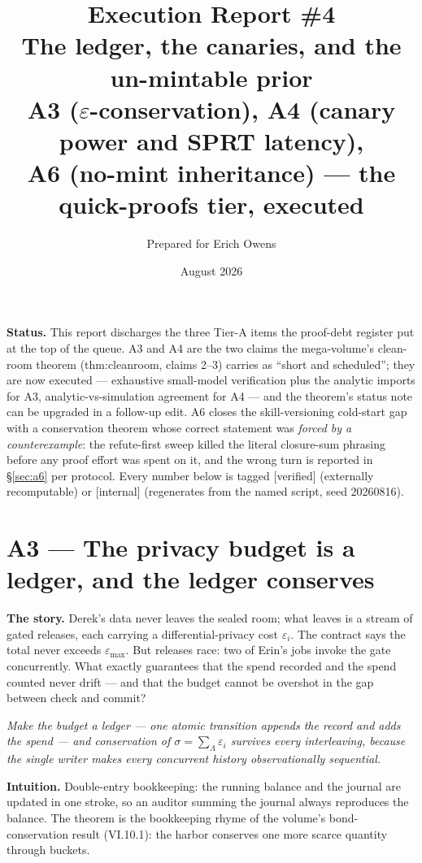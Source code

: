 \documentclass[11pt,a4paper]{article}
\title{\textbf{Execution Report \#4}\\[4pt]
\large The ledger, the canaries, and the un-mintable prior\\[3pt]
\normalsize A3 ($\varepsilon$-conservation), A4 (canary power and SPRT latency),\\ A6 (no-mint inheritance) --- the quick-proofs tier, executed}
\author{Prepared for Erich Owens}
\date{August 2026}
\newcommand{\onebreath}[1]{\begin{center}\emph{#1}\end{center}}
\begin{document}
\maketitle

\noindent\textbf{Status.} This report discharges the three Tier-A items the proof-debt register put at the top of the queue. A3 and A4 are the two claims the mega-volume's clean-room theorem (thm:cleanroom, claims 2--3) carries as ``short and scheduled''; they are now executed --- exhaustive small-model verification plus the analytic imports for A3, analytic-vs-simulation agreement for A4 --- and the theorem's status note can be upgraded in a follow-up edit. A6 closes the skill-versioning cold-start gap with a conservation theorem whose correct statement was \emph{forced by a counterexample}: the refute-first sweep killed the literal closure-sum phrasing before any proof effort was spent on it, and the wrong turn is reported in \S\ref{sec:a6} per protocol. Every number below is tagged [verified] (externally recomputable) or [internal] (regenerates from the named script, seed 20260816).

\section{A3 --- The privacy budget is a ledger, and the ledger conserves}
\textbf{The story.} Derek's data never leaves the sealed room; what leaves is a stream of gated releases, each carrying a differential-privacy cost $\varepsilon_i$. The contract says the total never exceeds $\varepsilon_{\max}$. But releases race: two of Erin's jobs invoke the gate concurrently. What exactly guarantees that the spend recorded and the spend counted never drift --- and that the budget cannot be overshot in the gap between check and commit?

\onebreath{Make the budget a ledger --- one atomic transition appends the record and adds the spend --- and conservation of $\sigma=\sum_\Lambda\varepsilon_i$ survives every interleaving, because the single writer makes every concurrent history observationally sequential.}

\textbf{Intuition.} Double-entry bookkeeping: the running balance and the journal are updated in one stroke, so an auditor summing the journal always reproduces the balance. The theorem is the bookkeeping rhyme of the volume's bond-conservation result (VI.10.1): the harbor conserves one more scarce quantity through buckets.
\end{document}
